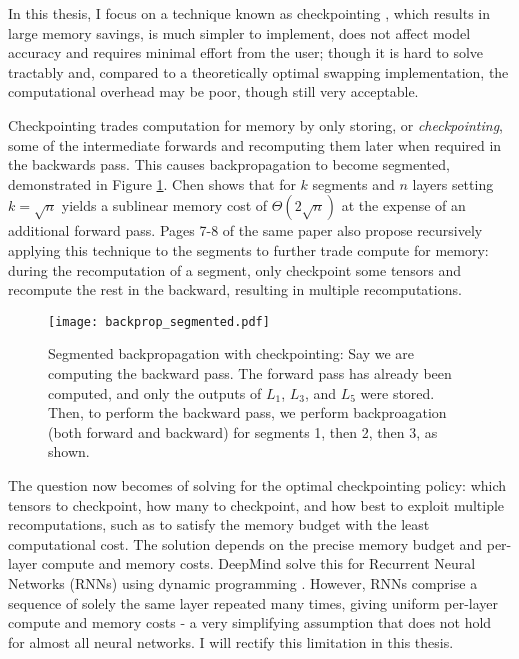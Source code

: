 In this thesis, I focus on a technique known as checkpointing \cite{Dauvergne2006, Siskind2018, Chen2016, Gruslys2016, Wang2018}, which results in large memory savings, is much simpler to implement, does not affect model accuracy and requires minimal effort from the user; though it is hard to solve tractably and, compared to a theoretically optimal swapping implementation, the computational overhead may be poor, though still very acceptable. 

Checkpointing trades computation for memory by only storing, or \textit{checkpointing}, some of the intermediate forwards and recomputing them later when required in the backwards pass. This causes backpropagation to become segmented, demonstrated in Figure \ref{fig:1-backprop-segmented}. Chen \cite{Chen2016} shows that for \(k\) segments and \(n\) layers setting \(k = \sqrt{n}\) yields a sublinear memory cost of \(\Theta (2\sqrt{n})\) at the expense of an additional forward pass. Pages 7-8 of the same paper also propose recursively applying this technique to the segments to further trade compute for memory: during the recomputation of a segment, only checkpoint some tensors and recompute the rest in the backward, resulting in multiple recomputations.

\begin{figure}[t]
    \centering
    \texttt{[image: backprop\_segmented.pdf]}
    \caption{Segmented backpropagation with checkpointing: Say we are computing the backward pass. The forward pass has already been computed, and only the outputs of \(L_1\), \(L_3\), and \(L_5\) were stored. Then, to perform the backward pass, we perform backproagation (both forward and backward) for segments 1, then 2, then 3, as shown.}
    \label{fig:1-backprop-segmented}
\end{figure}

The question now becomes of solving for the optimal checkpointing policy: which tensors to checkpoint, how many to checkpoint, and how best to exploit multiple recomputations, such as to satisfy the memory budget with the least computational cost. The solution depends on the precise memory budget and per-layer compute and memory costs. DeepMind solve this for Recurrent Neural Networks (RNNs) using dynamic programming \cite{Gruslys2016}. However, RNNs comprise a sequence of solely the same layer repeated many times, giving uniform per-layer compute and memory costs - a very simplifying assumption that does not hold for almost all neural networks. I will rectify this limitation in this thesis.

